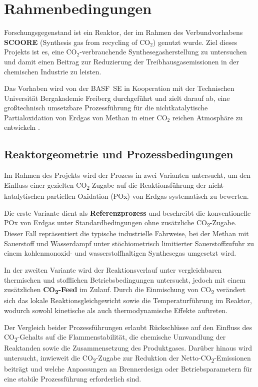 \chapter{Rahmenbedingungen}
    Forschungsgegenstand ist ein Reaktor, der im Rahmen des Verbundvorhabens \textbf{SCOORE} (Synthesis gas from recycling of CO$_2$) genutzt wurde. Ziel dieses Projekts ist es, eine CO$_2$-verbrauchende Synthesegasherstellung zu untersuchen und damit einen Beitrag zur Reduzierung der Treibhausgasemissionen in der chemischen Industrie zu leisten. 

    Das Vorhaben wird von der BASF~SE in Kooperation mit der Technischen Universität Bergakademie Freiberg durchgeführt und zielt darauf ab, eine großtechnisch umsetzbare Prozessführung für die nichtkatalytische Partialoxidation von Erdgas von Methan in einer CO$_2$ reichen Atmosphäre zu entwickeln \cite{Scoore_Enargus}.  
    \section{Reaktorgeometrie und Prozessbedingungen}
        Im Rahmen des Projekts wird der Prozess in zwei Varianten untersucht, um den Einfluss einer gezielten CO\textsubscript{2}-Zugabe auf die Reaktionsführung der nicht-katalytischen partiellen Oxidation (POx) von Erdgas systematisch zu bewerten. 
        
        Die erste Variante dient als \textbf{Referenzprozess} und beschreibt die konventionelle POx von Erdgas unter Standardbedingungen ohne zusätzliche CO\textsubscript{2}-Zugabe. Dieser Fall repräsentiert die typische industrielle Fahrweise, bei der Methan mit Sauerstoff und Wasserdampf unter stöchiometrisch limitierter Sauerstoffzufuhr zu einem kohlenmonoxid- und wasserstoffhaltigen Synthesegas umgesetzt wird. 
        
        In der zweiten Variante wird der Reaktionsverlauf unter vergleichbaren thermischen und stofflichen Betriebsbedingungen untersucht, jedoch mit einem zusätzlichen \textbf{CO\textsubscript{2}-Feed} im Zulauf. Durch die Einmischung von CO\textsubscript{2} verändert sich das lokale Reaktionsgleichgewicht sowie die Temperaturführung im Reaktor, wodurch sowohl kinetische als auch thermodynamische Effekte auftreten. 
        
        Der Vergleich beider Prozessführungen erlaubt Rückschlüsse auf den Einfluss des CO\textsubscript{2}-Gehalts auf die Flammenstabilität, die chemische Umwandlung der Reaktanden sowie die Zusammensetzung des Produktgases. Darüber hinaus wird untersucht, inwieweit die CO\textsubscript{2}-Zugabe zur Reduktion der Netto-CO\textsubscript{2}-Emissionen beiträgt und welche Anpassungen an Brennerdesign oder Betriebsparametern für eine stabile Prozessführung erforderlich sind.  
        
